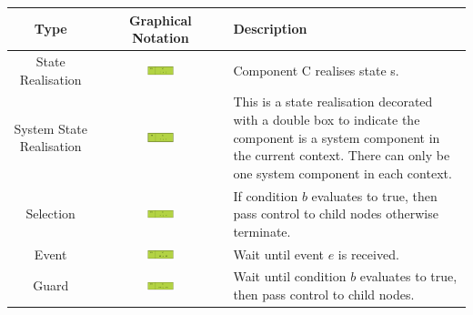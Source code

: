 \documentclass[]{article}
\begin{document}
\begin{landscape}
\singlespacing
\begin{center}
\begin{small}
\begin{tabular}[c]{|c|c|p{12cm}|}\hline
\textbf{Type} & \textbf{Graphical Notation} & \textbf{Description} \\ 
\hline
\hline
\multirow{3}{*}{State Realisation} & \multirow{3}{*}{\includegraphics[width=0.23\textwidth]{figs/AppendixB/BasicNodes/StateRealisation.pdf}} & \multirow{3}{12cm}{Component C realises state s.} \\*
&&\\
&&\\
\hline
\multirow{3}{*}{System State Realisation} & \multirow{3}{*}{\includegraphics[width=0.23\textwidth]{figs/AppendixB/BasicNodes/SystemStateRealisation.pdf}}& \multirow{3}{12cm}{This is a state realisation decorated with a double box to indicate the component is a system component in the current context. There can only be one system component in each context.}\\*
&&\\*
&&\\*
\hline
\multirow{3}{*}{Selection} & \multirow{3}{*}{\includegraphics[width=0.23\textwidth]{figs/AppendixB/BasicNodes/Selection.pdf}} & \multirow{3}{12cm}{If condition $b$ evaluates to true, then pass control to child nodes otherwise terminate.}\\*
&&\\ 
&&\\
\hline
\multirow{3}{*}{Event} & \multirow{3}{*}{\includegraphics[width=0.23\textwidth]{figs/AppendixB/BasicNodes/Event.pdf}} & \multirow{3}{12cm}{Wait until event $e$ is received.} \\*
&&\\
&&\\
\hline
\multirow{3}{*}{Guard} & \multirow{3}{*}{\includegraphics[width=0.23\textwidth]{figs/AppendixB/BasicNodes/Guard.pdf}} & \multirow{3}{12cm}{Wait until condition $b$ evaluates to true, then pass control to child nodes.} \\*

\end{tabular}
\end{small}
\end{center}
\end{landscape}
\end{document}
